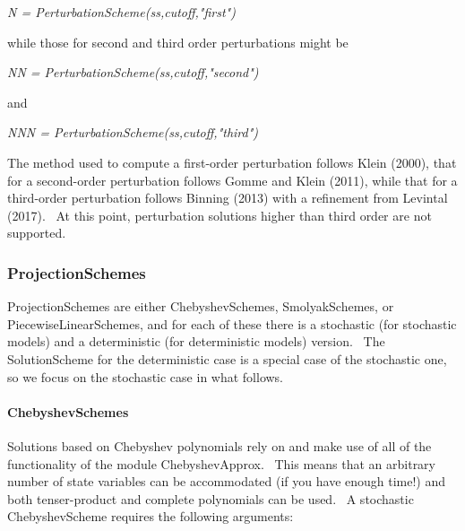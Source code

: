 \documentclass[notitlepage,11pt]{article}
\begin{document}
\bigskip

\textit{N = PerturbationScheme(ss,cutoff,"first")}

\bigskip

while those for second and third order perturbations might be

\bigskip

\textit{NN = PerturbationScheme(ss,cutoff,"second")}

\bigskip

and

\bigskip

\textit{NNN = PerturbationScheme(ss,cutoff,"third")}

\bigskip

The method used to compute a first-order perturbation follows Klein (2000),
that for a second-order perturbation follows Gomme and Klein (2011), while
that for a third-order perturbation follows Binning (2013) with a refinement
from Levintal (2017). \ At this point, perturbation solutions higher than
third order are not supported.

\subsubsection{ProjectionSchemes}

ProjectionSchemes are either ChebyshevSchemes, SmolyakSchemes, or
PiecewiseLinearSchemes, and for each of these there is a stochastic (for
stochastic models) and a deterministic (for deterministic models) version. \
The SolutionScheme for the deterministic case is a special case of the
stochastic one, so we focus on the stochastic case in what follows.

\paragraph{ChebyshevSchemes}

Solutions based on Chebyshev polynomials rely on and make use of all of the
functionality of the module ChebyshevApprox. \ This means that an arbitrary
number of state variables can be accommodated (if you have enough time!) and
both tenser-product and complete polynomials can be used. \ A stochastic
ChebyshevScheme requires the following arguments:
\end{document}
